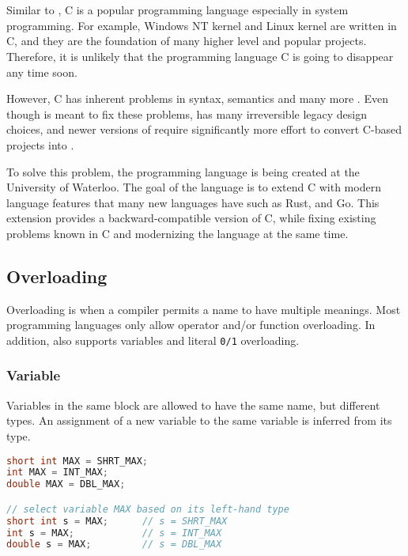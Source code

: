 \chapter{\CFA} \label{CFA}
Similar to \CC, C is a popular programming language especially in system
programming. For example, Windows NT kernel and Linux kernel are written in C, and they are the foundation of many higher level
and popular projects. Therefore, it is unlikely that the programming language C is
going to disappear any time soon.

However, C has inherent problems in syntax, semantics and many
more \cite{reference2}. Even though \CCS is meant to fix these problems, \CCS has many
irreversible legacy design choices, and newer versions of \CCS require significantly more effort to convert C-based projects into \CCS.

To solve this problem, the programming language \CFAS is being created at the University of Waterloo. The goal
of the language is to extend C with modern language features that many new
languages have such as Rust, and Go. This extension provides a
backward-compatible version of C, while fixing existing problems known in C and
modernizing the language at the same time.

\section{Overloading}
Overloading is when a compiler permits a name to have multiple meanings. Most programming languages only allow operator and/or function overloading.
In addition, \CFAS also supports variables and literal
\verb|0/1| overloading.

\subsection{Variable}
Variables in the same block are allowed to have the same name, but different
types. An assignment of a new variable to the same variable is inferred from its type.


\begin{lstlisting}[language=C++, caption={Overloading variables in \CFA}, label={CFA-overload-var}]
short int MAX = SHRT_MAX;
int MAX = INT_MAX;
double MAX = DBL_MAX;

// select variable MAX based on its left-hand type
short int s = MAX;      // s = SHRT_MAX
int s = MAX;            // s = INT_MAX
double s = MAX;         // s = DBL_MAX
\end{lstlisting}

